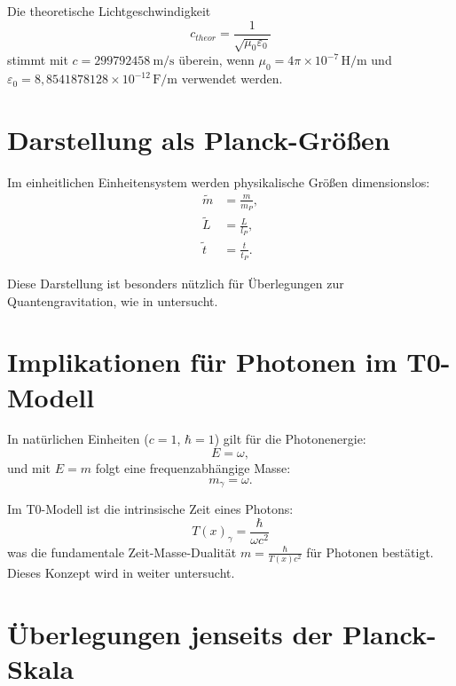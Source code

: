 \documentclass[12pt,a4paper]{article}
\newcommand{\Tfield}{T(x)}
\begin{document}
	Die theoretische Lichtgeschwindigkeit
	\begin{equation}
		c_{theor} = \frac{1}{\sqrt{\mu_0 \varepsilon_0}}
	\end{equation}
	stimmt mit \(c = \SI{299792458}{\meter\per\second}\) überein, wenn \(\mu_0 = 4\pi \times 10^{-7} \, \si{\henry\per\meter}\) und \(\varepsilon_0 = 8,8541878128 \times 10^{-12} \, \si{\farad\per\meter}\) verwendet werden.
	
	\section{Darstellung als Planck-Größen}
	\label{sec:planck_quantities}
	
	Im einheitlichen Einheitensystem werden physikalische Größen dimensionslos:
	\begin{align}
		\tilde{m} &= \frac{m}{m_P}, \\
		\tilde{L} &= \frac{L}{l_P}, \\
		\tilde{t} &= \frac{t}{t_P}.
	\end{align}
	
	Diese Darstellung ist besonders nützlich für Überlegungen zur Quantengravitation, wie in \cite{pascher_planck_2025} untersucht.
	
	\section{Implikationen für Photonen im T0-Modell}
	\label{sec:photons}
	
	In natürlichen Einheiten (\(c = 1\), \(\hbar = 1\)) gilt für die Photonenergie:
	\begin{equation}
		E = \omega,
	\end{equation}
	und mit \(E = m\) folgt eine frequenzabhängige Masse:
	\begin{equation}
		m_{\gamma} = \omega.
	\end{equation}
	
	Im T0-Modell ist die intrinsische Zeit eines Photons:
	\begin{equation}
		\Tfield_{\gamma} = \frac{\hbar}{\omega c^2}
	\end{equation}
	was die fundamentale Zeit-Masse-Dualität \(m = \frac{\hbar}{\Tfield c^2}\) für Photonen bestätigt. Dieses Konzept wird in \cite{pascher_photons_2025} weiter untersucht.
	
	\section{Überlegungen jenseits der Planck-Skala}
	\label{sec:beyond_planck}
	
\end{document}
